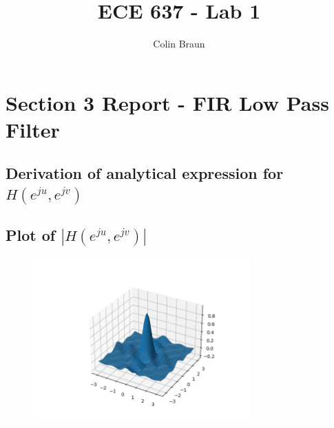\documentclass{article}
\title{ECE 637 - Lab 1}
\author{Colin Braun}
\begin{document}
\maketitle

\section{Section 3 Report - FIR Low Pass Filter}
\subsection{Derivation of analytical expression for $H(e^{ju}, e^{jv})$}
\subsection{Plot of $|H(e^{ju}, e^{jv})|$}
\begin{figure}[H]
    \centering
    \includegraphics[width=0.75\textwidth]{../results/section3-python.png}
    \begin{center}
    \end{center}
    \label{fig:A1}
\end{figure}
\end{document}

